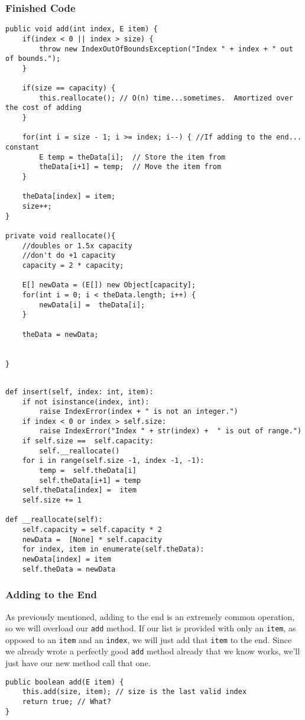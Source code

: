 \subsubsection{Finished Code}
\begin{verbatim}
public void add(int index, E item) {
	if(index < 0 || index > size) {
		throw new IndexOutOfBoundsException("Index " + index + " out of bounds.");
	}
	
	if(size == capacity) {  
		this.reallocate(); // O(n) time...sometimes.  Amortized over the cost of adding
	}
	
	for(int i = size - 1; i >= index; i--) { //If adding to the end... constant
		E temp = theData[i];  // Store the item from 
		theData[i+1] = temp;  // Move the item from 
	}
	
	theData[index] = item;
	size++;
}

private void reallocate(){
	//doubles or 1.5x capacity
	//don't do +1 capacity
	capacity = 2 * capacity;
	
	E[] newData = (E[]) new Object[capacity];
	for(int i = 0; i < theData.length; i++) {
		newData[i] =  theData[i];
	}
	
	theData = newData;
	
	
}
\end{verbatim}


\begin{verbatim}
	
def insert(self, index: int, item):
	if not isinstance(index, int):
		raise IndexError(index + " is not an integer.")
	if index < 0 or index > self.size:
		raise IndexError("Index " + str(index) +  " is out of range.")
	if self.size ==  self.capacity:
		self.__reallocate()
	for i in range(self.size -1, index -1, -1):
		temp =  self.theData[i]
		self.theData[i+1] = temp
	self.theData[index] =  item
	self.size += 1
	
def __reallocate(self):
	self.capacity = self.capacity * 2
	newData =  [None] * self.capacity
	for index, item in enumerate(self.theData):
	newData[index] = item
	self.theData = newData
\end{verbatim}


\subsubsection{Adding to the End}

As previously  mentioned, adding to the end is an extremely common operation, so we will overload our \texttt{add} method.
If our list is provided with only an \texttt{item}, as opposed to an \texttt{item} and an \texttt{index}, we will just add that \texttt{item} to the end.
Since we already wrote a perfectly good \texttt{add} method already that we know works, we'll just have our new method call that one.
\begin{verbatim}
public boolean add(E item) {
	this.add(size, item); // size is the last valid index
	return true; // What?
}
\end{verbatim}

